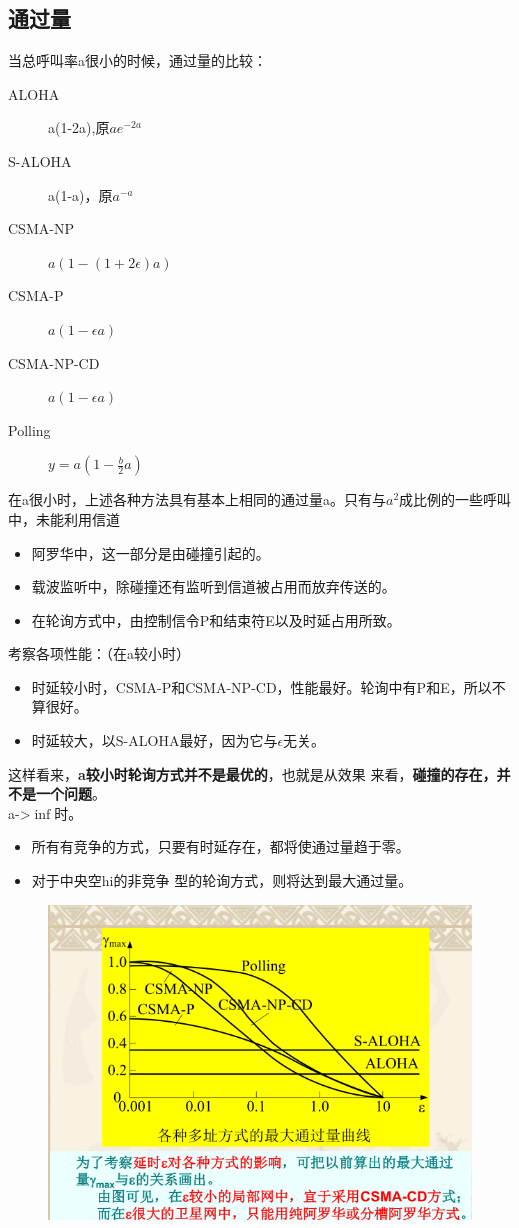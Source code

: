 \subsection{通过量}
当总呼叫率a很小的时候，通过量的比较：
\begin{description}
	\item[ALOHA] a(1-2a),原$ ae^{-2a} $
	\item[S-ALOHA] a(1-a)，原$ a^{-a} $
	\item[CSMA-NP] $ a(1-(1+2\epsilon)a) $ 
	\item[CSMA-P] $ a(1-\epsilon a) $
	\item[CSMA-NP-CD] $ a(1-\epsilon a) $
	\item[Polling] $ y = a(1-\frac{b}{2}a) $
\end{description}
在a很小时，上述各种方法具有基本上相同的通过量a。只有与$ a^2 $成比例的一些呼叫中，未能利用信道
\begin{itemize}
	\item 阿罗华中，这一部分是由碰撞引起的。
	\item 载波监听中，除碰撞还有监听到信道被占用而放弃传送的。
	\item 在轮询方式中，由控制信令P和结束符E以及时延占用所致。
\end{itemize}
考察各项性能：（在a较小时）
\begin{itemize}
	\item 时延较小时，CSMA-P和CSMA-NP-CD，性能最好。轮询中有P和E，所以不算很好。
	\item 时延较大，以S-ALOHA最好，因为它与$ \epsilon $无关。
\end{itemize}
这样看来，\textbf{a较小时轮询方式并不是最优的}，也就是从效果
来看，\textbf{碰撞的存在，并不是一个问题}。\\
a->$ \inf $时。
\begin{itemize}
	\item 所有有竞争的方式，只要有时延存在，都将使通过量趋于零。
	\item 对于中央空hi的非竞争 型的轮询方式，则将达到最大通过量。
\end{itemize}
\begin{figure}[H]
	\centering
	\includegraphics[width=0.7\linewidth]{figures/screenshot016}
	\caption{}
	\label{fig:screenshot016}
\end{figure}
